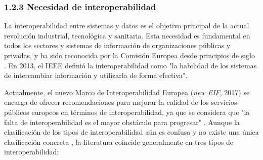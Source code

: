 \begin{itemize}
\end{itemize}

\subsubsection{1.2.3 Necesidad de interoperabilidad}


La interoperabilidad entre sistemas y datos es el objetivo principal de la actual revolución industrial, tecnológica y sanitaria. Esta necesidad es fundamental en todos los sectores y sistemas de información de organizaciones públicas y privadas, y ha sido reconocida por la Comisión Europea desde principios de siglo \cite{CEU1999ida}. En 2013, el IEEE definió la interoperabilidad como "la habilidad de los sistemas de intercambiar información y utilizarla de forma efectiva". 

Actualmente, el nuevo Marco de Interoperabilidad Europea (\textit{new EIF}, 2017) se encarga de ofrecer recomendaciones para mejorar la calidad de los servicios públicos europeos en términos de interoperabilidad, ya que se considera que "la falta de interoperabilidad es el mayor obstáculo para progresar" \cite{kouroubali2019new}. Aunque la clasificación de los tipos de interoperabilidad aún es confusa y no existe una única clasificación concreta \cite{santos2021interoperability}, la literatura coincide generalmente en tres tipos de interoperabilidad:

